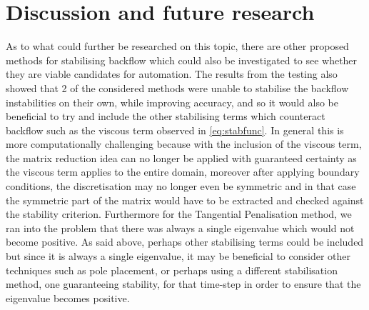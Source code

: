 \section{Discussion and future research}
As to what could further be researched on this topic, there are other proposed methods for stabilising backflow which could also be investigated to see whether they are viable candidates for automation. The results from the testing also showed that 2 of the considered methods were unable to stabilise the backflow instabilities on their own, while improving accuracy, and so it would also be beneficial to try and include the other stabilising terms which counteract backflow such as the viscous term observed in \autoref{eq:stabfunc}. In general this is more computationally challenging because with the inclusion of the viscous term, the matrix reduction idea can no longer be applied with guaranteed certainty as the viscous term applies to the entire domain, moreover after applying boundary conditions, the discretisation may no longer even be symmetric and in that case the symmetric part of the matrix would have to be extracted and checked against the stability criterion. Furthermore for the Tangential Penalisation method, we ran into the problem that there was always a single eigenvalue which would not become positive. As said above, perhaps other stabilising terms could be included but since it is always a single eigenvalue, it may be beneficial to consider other techniques such as pole placement, or perhaps using a different stabilisation method, one guaranteeing stability, for that time-step in order to ensure that the eigenvalue becomes positive.
